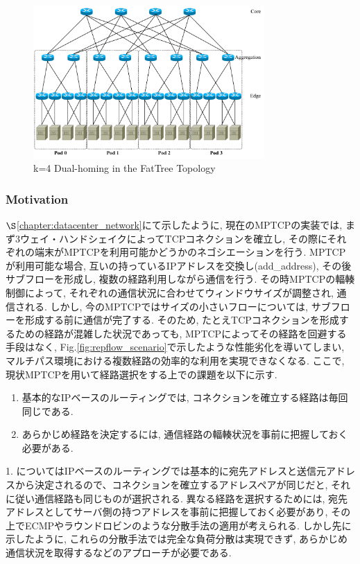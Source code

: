 \begin{figure}[t]
    \begin{center}
    \includegraphics[autoebb, width=250pt]{./img/dhft.pdf}
    \caption{k=4 Dual-homing in the FatTree Topology}
    \label{fig:dual-homing}
    \end{center}
\end{figure}

\subsubsection{Motivation}

$\S$\ref{chapter:datacenter_network}にて示したように, 現在のMPTCPの実装では,
まず3ウェイ・ハンドシェイクによってTCPコネクションを確立し, その際にそれぞれの端末がMPTCPを利用可能かどうかのネゴシエーションを行う.
MPTCPが利用可能な場合, 互いの持っているIPアドレスを交換し(add\_address), その後サブフローを形成し, 複数の経路利用しながら通信を行う. 
その時MPTCPの輻輳制御によって, それぞれの通信状況に合わせてウィンドウサイズが調整され, 通信される\cite{balia}. 
しかし, 今のMPTCPではサイズの小さいフローについては, サブフローを形成する前に通信が完了する. 
そのため, たとえTCPコネクションを形成するための経路が混雑した状況であっても, MPTCPによってその経路を回避する手段はなく,
Fig.\ref{fig:repflow_scenario}で示したような性能劣化を導いてしまい,
マルチパス環境における複数経路の効率的な利用を実現できなくなる. 
ここで, 現状MPTCPを用いて経路選択をする上での課題を以下に示す. 
\begin{enumerate}
\item 基本的なIPベースのルーティングでは, コネクションを確立する経路は毎回同じである. 
\item あらかじめ経路を決定するには, 通信経路の輻輳状況を事前に把握しておく必要がある. 
\end{enumerate} 
1. についてはIPベースのルーティングでは基本的に宛先アドレスと送信元アドレスから決定されるので、コネクションを確立するアドレスペアが同じだと,
それに従い通信経路も同じものが選択される. 
異なる経路を選択するためには, 宛先アドレスとしてサーバ側の持つアドレスを事前に把握しておく必要があり,
その上でECMPやラウンドロビンのような分散手法の適用が考えられる.
しかし先に示したように, これらの分散手法では完全な負荷分散は実現できず, あらかじめ通信状況を取得するなどのアプローチが必要である. 


